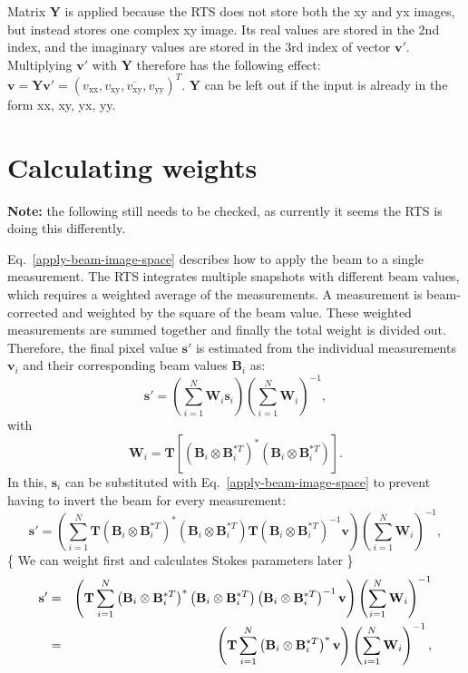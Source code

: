 \documentclass[a4paper,11pt]{article}
\begin{document}
Matrix $\mathbf{Y}$ is applied because the RTS does not store both the xy and yx images, but instead stores one complex xy image. Its real values are stored in the 2nd index, and the imaginary values are stored in the 3rd index of vector $\mathbf{v}'$. Multiplying $\mathbf{v}'$ with $\mathbf{Y}$ therefore has the following effect: $\mathbf{v}=\mathbf{Y}\mathbf{v}' = \left(v_\textrm{xx},v_\textrm{xy}, \overline{v_\textrm{xy}},v_\textrm{yy}\right)^T$. $\mathbf{Y}$ can be left out if the input is already in the form xx, xy, yx, yy.

\section{Calculating weights}
\textbf{Note:} the following still needs to be checked, as currently it seems the RTS is doing this differently.

Eq.~\ref{apply-beam-image-space} describes how to apply the beam to a single measurement. The RTS integrates multiple snapshots with different beam values, which requires a weighted average of the measurements. A measurement is beam-corrected and weighted by the square of the beam value. These weighted measurements are summed together and finally the total weight is divided out. Therefore, the final pixel value $\mathbf{s'}$ is estimated from the individual measurements $\mathbf{v}_i$ and their corresponding beam values $\mathbf{B}_i$ as:
\begin{equation}
\mathbf{s'} = \left( \sum\limits_{i=1}^N \textbf{W}_i \mathbf{s}_i \right) \left( \sum\limits_{i=1}^N \textbf{W}_i \right)^{-1},
\end{equation}
with
\begin{equation}
\textbf{W}_i = \mathbf{T} \left[ \left(\mathbf{B}_i \otimes \mathbf{B}_i^{*T} \right)^* \left(\mathbf{B}_i \otimes \mathbf{B}_i^{*T} \right)\right].
\end{equation}
In this, $\mathbf{s}_i$ can be substituted with Eq.~\ref{apply-beam-image-space} to prevent having to invert the beam for every measurement:
\begin{equation}
\mathbf{s'} = 
\left(
  \sum\limits_{i=1}^N \mathbf{T} \left(\mathbf{B}_i \otimes \mathbf{B}_i^{*T} \right)^* \left(\mathbf{B}_i \otimes \mathbf{B}_i^{*T} \right) 
  \mathbf{T} \left(\mathbf{B}_i \otimes \mathbf{B}_i^{*T} \right)^{-1} \mathbf{v}
\right)
\left( \sum\limits_{i=1}^N \textbf{W}_i \right)^{-1},
\end{equation}
\{ We can weight first and calculates Stokes parameters later \}
\begin{eqnarray}
\notag
\mathbf{s'} & =  &
\left(
  \mathbf{T} \sum\limits_{i=1}^N \left(\mathbf{B}_i \otimes \mathbf{B}_i^{*T} \right)^* \left(\mathbf{B}_i \otimes \mathbf{B}_i^{*T} \right) 
  \left(\mathbf{B}_i \otimes \mathbf{B}_i^{*T} \right)^{-1} \mathbf{v}
\right)
\left( \sum\limits_{i=1}^N \textbf{W}_i \right)^{-1} \\
& = &
\left(
  \mathbf{T} \sum\limits_{i=1}^N \left(\mathbf{B}_i \otimes \mathbf{B}_i^{*T} \right)^* \mathbf{v}
\right)
\left( \sum\limits_{i=1}^N \textbf{W}_i \right)^{-1},
\end{eqnarray}
\end{document}

